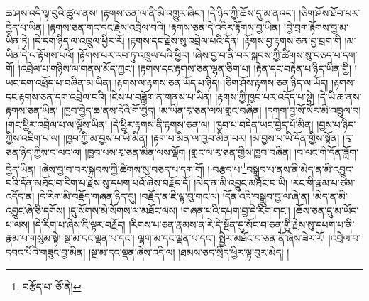 ཆ་ཤས་འདི་ལྟ་བུའི་ཚུལ་ནས། །རྟགས་ཅན་ལ་ནི་མི་འགྱུར་ཞིང་། །དེ་ཉིད་ཀྱི་ཆོས་དུ་མ་ནའང་། །ཅིག་ཤོས་ཐོབ་པར་བྱེད་པ་ཡིན། །རྟགས་ཅན་གང་དང་རྗེས་འབྲེལ་བའི། །རྟགས་ཅན་དེ་འདིར་རྟོགས་བྱ་ཡིན། །བྱེ་བྲག་རྟོགས་བྱ་མ་ཡིན་ཏེ། །དེ་དག་ཉིད་ལ་འཁྲུལ་ཕྱིར་རོ། །རྟགས་དང་རྗེས་སུ་འབྲེལ་པའི་དོན། །རྟོགས་བྱ་རྟགས་ཅན་བྱ་བྲག་གི །མ་ཡིན་དེ་ལ་རྟོགས་པའོ། །རྟོགས་པར་རབ་ཏུ་འཁྲུལ་པའི་ཕྱིར། །ཞེས་བྱ་བ་ནི་བར་སྐབས་ཀྱི་ཚིགས་སུ་བཅད་པ་དག་གོ། །འབྲེལ་པ་གཉིས་ལ་གནས་མོད་ཀྱང་། །རྟགས་དང་རྟགས་ཅན་ལྷན་ཅིག་པ། །རྟེན་དང་བརྟེན་པ་ཉིད་ཡིན་གྱི། །ཡང་དག་འཕྲོད་པ་བཞིན་མ་ཡིན། །རྟགས་ལ་རྟགས་ཅན་ཡོད་པ་ཉིད། །ཅིག་ཤོས་རྟགས་ཅན་ཉིད་ལ་ཡོད། །རྟགས་དང་རྟགས་ཅན་དག་འབྲེལ་བའི། །ངེས་པ་བཟློག་ན་གནས་པ་ཡིན། །རྟགས་ཀྱི་ཁྱབ་པར་འདོད་པ་སྟེ། །དེ་ཡི་ཆ་ནས་རྟགས་ཅན་ཡིན། །ཁྱབ་བྱེད་ཆ་ནས་དེའི་གོ་བྱེད། །མ་ཡིན་རྭ་ཅན་ལས་གླང་བཞིན། །དགག་བྱ་སོ་སོར་མི་འཁྲུལ་བ། །གང་ཕྱིར་འབྲེལ་པ་ལ་ལྟོས་ཡིན། །དེ་ཕྱིར་རྟགས་ནི་རྟགས་ཅན་ལ། །ཁྱབ་པ་བདེན་ཡང་བྱེད་པོ་མིན། །བྱས་པ་ཉིད་ཀྱིས་འཇིག་པ་ལ། །ཁྱབ་ཀྱི་མ་བྱས་པ་ཡི་མིན། །རྟག་པ་མིན་ལ་ཁྱབ་མིན་པར། །མ་བྱས་པ་ཡི་དོན་གྱིས་སྟོན། །རྭ་ཅན་ཉིད་ཀྱིས་བ་ལང་ལ། །ཁྱབ་པས་རྭ་ཅན་མིན་ལས་ལྡོག །གླང་ལ་རྭ་ཅན་གྱིས་ཁྱབ་བཞིན། །བ་ལང་གི་དོན་ཟློག་བྱེད་ཡིན། །ཞེས་བྱ་བ་བར་སྐབས་ཀྱི་ཚིགས་སུ་བཅད་པ་དག་གོ། །:བརྩད་པ་\footnote{བརྩོད་པ་  ཅོ་ནེ། }བསྒྲུབ་པ་ནས་ནི་མེད་ན་མི་འབྱུང་བའི་དོན་མཐོང་བ་རིག་པ་རྗེས་སུ་དཔག་པའོ་ཞེས་བརྗོད་དོ། །མེད་ན་མི་འབྱུང་མཐོང་བ་ཡི། །རང་གི་རྣམ་པ་ཙམ་འདོད་ན། །དེ་རིག་མི་བརྗོད་གཞན་ཉིད་དུ། །བརྗོད་ན་ཇི་ལྟ་བུ་གང་ལ། །དོན་འདི་བསྒྲུབ་བྱ་ལ་ཞེ་ན། །མེད་ན་མི་འབྱུང་ཞེ་ཅི་དགོས། །དུ་སོགས་མེ་སོགས་ལ་མཐོང་ལས། །གཞན་པའི་དཔག་བྱ་དེ་རིག་གང་། །ཆོས་ཅན་དུ་མ་ཡོད་པ་ལས། །དེ་རིག་པ་ཞེས་ཇི་ལྟར་བརྗོད། །རིགས་པ་ཅན་རྣམས་ན་རེ་དེ་སྔོན་དུ་སོང་བ་ཅན་གྱི་རྗེས་སུ་དཔག་པ་ནི་རྣམ་པ་གསུམ་སྟེ། སྔ་མ་དང་ལྡན་པ་དང་། ལྷག་མ་དང་ལྡན་པ་དང་། སྤྱིར་མཐོང་བ་ཅན་ནོ་ཞེས་ཟེར་རོ། །འབྲེལ་བ་དབང་པོའི་གཟུང་བྱ་མིན། །སྔ་མ་དང་ལྡན་ཞེས་འདི་ལ། །ཐམས་ཅད་སྲིད་ཕྱིར་ལྟ་བུར་མེད། །
